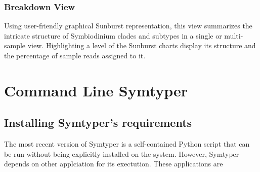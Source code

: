 \documentclass[letterpaper,10pt,english]{sphinxmanual}
\begin{document}
\subsection{Breakdown View}
\label{Web:breakdown-view}\begin{figure}[htbp]
\centering

\end{figure}

Using user-friendly graphical Sunburst representation,
this view summarizes the intricate structure of Symbiodinium clades and subtypes
in a single or multi-sample view. Highlighting a level of the Sunburst charts display
its structure and the percentage of sample reads assigned to it.


\chapter{Command Line Symtyper}
\label{CommandLine::doc}\label{CommandLine:command-line-symtyper}

\section{Installing Symtyper's requirements}
\label{CommandLine:installing-symtyper-s-requirements}
The most recent version of Symtyper is a self-contained Python script that can be run without being explicitly installed on the system.
However, Symtyper depends on other applciation for its exectution. These applications are
\end{document}

